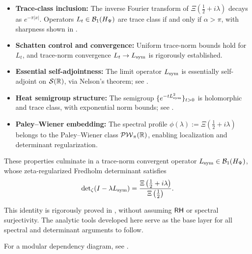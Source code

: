 \begin{itemize}
    \item \textbf{Trace-class inclusion:} The inverse Fourier transform of \( \Xi(\tfrac{1}{2} + i\lambda) \) decays as \( e^{-\pi|x|} \). Operators \( L_t \in \mathcal{B}_1(H_{\Psi}) \) are trace class if and only if \( \alpha > \pi \), with sharpness shown in .
    
    \item \textbf{Schatten control and convergence:} Uniform trace-norm bounds hold for \( L_t \), and trace-norm convergence \( L_t \to L_{\mathrm{sym}} \) is rigorously established.
    
    \item \textbf{Essential self-adjointness:} The limit operator \( L_{\mathrm{sym}} \) is essentially self-adjoint on \( \mathcal{S}(\mathbb{R}) \), via Nelson's theorem; see .
    
    \item \textbf{Heat semigroup structure:} The semigroup \( \{e^{-t L_{\mathrm{sym}}^2}\}_{t > 0} \) is holomorphic and trace class, with exponential norm bounds; see .
    
    \item \textbf{Paley--Wiener embedding:} The spectral profile \( \phi(\lambda) := \Xi(\tfrac{1}{2} + i\lambda) \) belongs to the Paley--Wiener class \( \mathcal{PW}_{\pi}(\mathbb{R}) \), enabling localization and determinant regularization.
\end{itemize}

These properties culminate in a trace-norm convergent operator \( L_{\mathrm{sym}} \in \mathcal{B}_1(H_{\Psi}) \), whose zeta-regularized Fredholm determinant satisfies
\[
\det\nolimits_{\zeta}(I - \lambda L_{\mathrm{sym}}) = \frac{\Xi\left(\tfrac{1}{2} + i\lambda\right)}{\Xi\left(\tfrac{1}{2}\right)}.
\]

This identity is rigorously proved in , without assuming \( \mathsf{RH} \) or spectral surjectivity. The analytic tools developed here serve as the base layer for all spectral and determinant arguments to follow.

For a modular dependency diagram, see .
